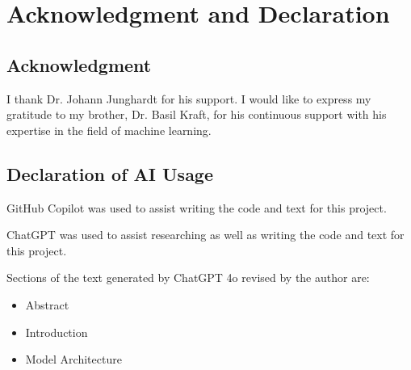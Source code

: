 


\section{Acknowledgment and Declaration}
\label{acknowledgment_declaration}

\subsection{Acknowledgment}%

I thank Dr. Johann Junghardt for his support.
I would like to express my gratitude to my brother, Dr. Basil Kraft, for his continuous
support with his expertise in the field of machine learning. 

\subsection{Declaration of AI Usage}%

GitHub Copilot was used to assist writing the code and text for this project.

ChatGPT was used to assist researching as well as writing the code and text for this project.

Sections of the text generated by ChatGPT 4o revised by the author are:
\begin{itemize}
    \item Abstract
    \item Introduction
    \item Model Architecture
\end{itemize}

\newpage
{}

